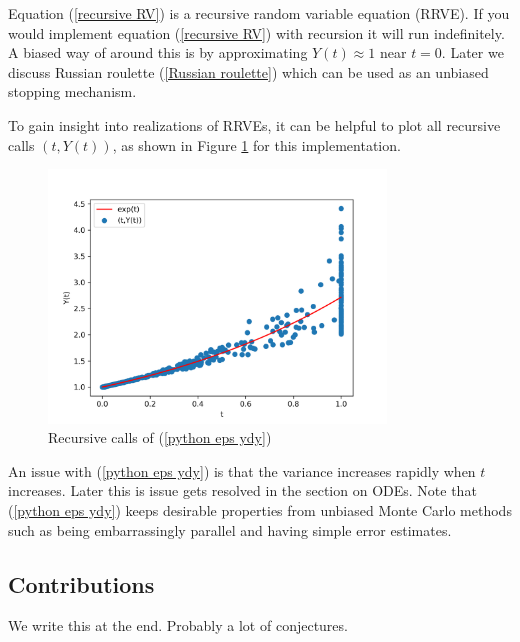 \documentclass[a4paper,12pt]{article}
\begin{document}
Equation (\ref{recursive RV}) is a recursive random variable equation (RRVE). If you would implement equation
(\ref{recursive RV}) with recursion it will run indefinitely. A biased way of around this is by approximating
$Y(t) \approx 1$ near $t = 0$. Later we discuss Russian roulette (\ref{Russian roulette}) which
can be used as an unbiased stopping mechanism.

\vspace*{0.2cm}

\begin{pythonn} \label{python eps ydy}
    To gain insight into realizations of RRVEs, it can be helpful to plot
    all recursive calls $(t,Y(t))$, as shown in Figure \ref{fig:intro example}
    for this implementation.

    \begin{figure}[h!]
        \centering
        \includegraphics[width=0.8\textwidth]{plots/intro example.png}
        \caption{Recursive calls of (\ref{python eps ydy})}
        \label{fig:intro example}
    \end{figure}
\end{pythonn}

An issue with (\ref{python eps ydy}) is that the variance increases rapidly when $t$ increases. Later
this is issue gets resolved in the section on ODEs. Note that (\ref{python eps ydy}) keeps desirable properties
from unbiased Monte Carlo methods such as being embarrassingly parallel and
having simple error estimates.


\subsection{Contributions}
We write this at the end. Probably a lot of conjectures.
\end{document}
